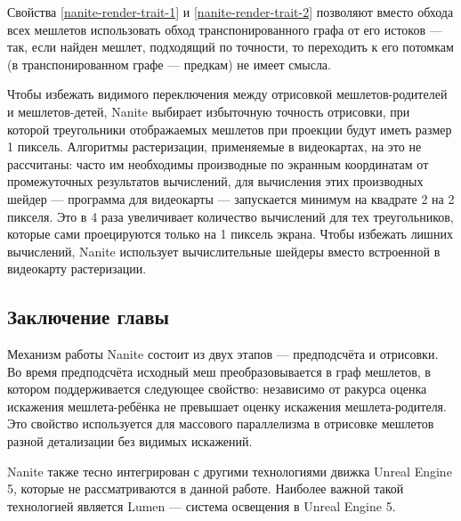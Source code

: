 Свойства \ref{nanite-render-trait-1} и \ref{nanite-render-trait-2} позволяют вместо обхода всех мешлетов использовать обход транспонированного графа от его истоков --- так, если найден мешлет, подходящий по точности, то переходить к его потомкам (в транспонированном графе --- предкам) не имеет смысла.

Чтобы избежать видимого переключения между отрисовкой мешлетов-родителей и мешлетов-детей, Nanite выбирает избыточную точность отрисовки, при которой треугольники отображаемых мешлетов при проекции будут иметь размер 1 пиксель.
Алгоритмы растеризации, применяемые в видеокартах, на это не рассчитаны: часто им необходимы производные по экранным координатам от промежуточных результатов вычислений, для вычисления этих производных шейдер --- программа для видеокарты --- запускается минимум на квадрате 2 на 2 пикселя.
Это в 4 раза увеличивает количество вычислений для тех треугольников, которые сами проецируются только на 1 пиксель экрана.
Чтобы избежать лишних вычислений, Nanite использует вычислительные шейдеры вместо встроенной в видеокарту растеризации.

\subsection*{Заключение главы}
Механизм работы Nanite состоит из двух этапов --- предподсчёта и отрисовки.
Во время предподсчёта исходный меш преобразовывается в граф мешлетов, в котором поддерживается следующее свойство: независимо от ракурса оценка искажения мешлета-ребёнка не превышает оценку искажения мешлета-родителя.
Это свойство используется для массового параллелизма в отрисовке мешлетов разной детализации без видимых искажений.

Nanite также тесно интегрирован с другими технологиями движка Unreal Engine 5, которые не рассматриваются в данной работе.
Наиболее важной такой технологией является Lumen --- система освещения в Unreal Engine 5.
